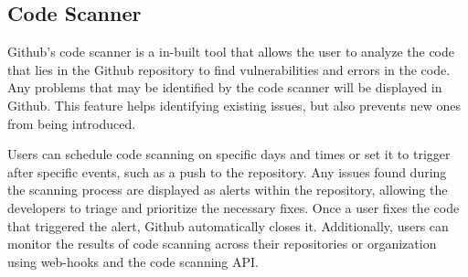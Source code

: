 \subsection{Code Scanner}
Github's code scanner is a in-built tool that allows the user to analyze the code that lies in the Github repository to find vulnerabilities and errors in the code. Any problems that may be identified by the code scanner will be displayed in Github. This feature helps identifying existing issues, but also prevents new ones from being introduced. 

Users can schedule code scanning on specific days and times or set it to trigger after specific events, such as a push to the repository. Any issues found during the scanning process are displayed as alerts within the repository, allowing the developers to triage and prioritize the necessary fixes. Once a user fixes the code that triggered the alert, Github automatically closes it. Additionally, users can monitor the results of code scanning across their repositories or organization using web-hooks and the code scanning API. 
\cite{GithubCodeScanning}


